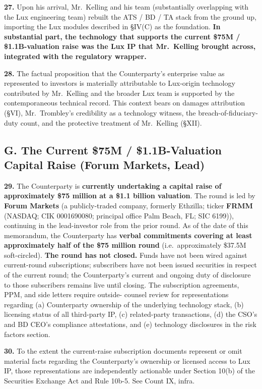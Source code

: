 \documentclass[11pt,letterpaper]{article}
\begin{document}
\textbf{27.} Upon his arrival, Mr.\ Kelling and his team (substantially
overlapping with the Lux engineering team) rebuilt the ATS / BD / TA
stack from the ground up, importing the Lux modules described in
\S IV(C) as the foundation. \textbf{In substantial part, the
technology that supports the current \$75M / \$1.1B-valuation raise was the Lux
IP that Mr.\ Kelling brought across, integrated with the regulatory
wrapper.}

\textbf{28.} The factual proposition that the Counterparty's
enterprise value as represented to investors is materially attributable
to Lux-origin technology contributed by Mr.\ Kelling and the broader
Lux team is supported by the contemporaneous technical record. This
context bears on damages attribution (\S VI), Mr.\ Trombley's
credibility as a technology witness, the breach-of-fiduciary-duty
count, and the protective treatment of Mr.\ Kelling (\S XII).

\subsection*{G. The Current \$75M / \$1.1B-Valuation Capital Raise (Forum Markets, Lead)}

\textbf{29.} The Counterparty is \textbf{currently undertaking a
capital raise of approximately \$75 million at a \$1.1 billion
valuation}. The round is led by \textbf{Forum Markets} (a
publicly-traded company, formerly Ethzilla; ticker \textbf{FRMM} (NASDAQ; CIK 0001690080; principal office Palm Beach, FL; SIC 6199)), continuing in the lead-investor
role from the prior round. As of the date of this memorandum, the
Counterparty has \textbf{verbal commitments covering at least
approximately half of the \$75 million round} (i.e.\ approximately
\$37.5M soft-circled). \textbf{The round has not closed.} Funds have
not been wired against current-round subscriptions; subscribers have
not been issued securities in respect of the current round; the
Counterparty's current and ongoing duty of disclosure to those
subscribers remains live until closing.
The subscription agreements, PPM, and side letters require outside-
counsel review for representations regarding (a) Counterparty
ownership of the underlying technology stack, (b) licensing status of
all third-party IP, (c) related-party transactions, (d) the CSO's
and BD CEO's compliance attestations, and (e) technology disclosures
in the risk factors section.

\textbf{30.} To the extent the current-raise subscription documents represent or omit
material facts regarding the Counterparty's ownership or licensed
access to Lux IP, those representations are independently actionable
under Section 10(b) of the Securities Exchange Act and Rule 10b-5.
See Count IX, infra.
\end{document}
